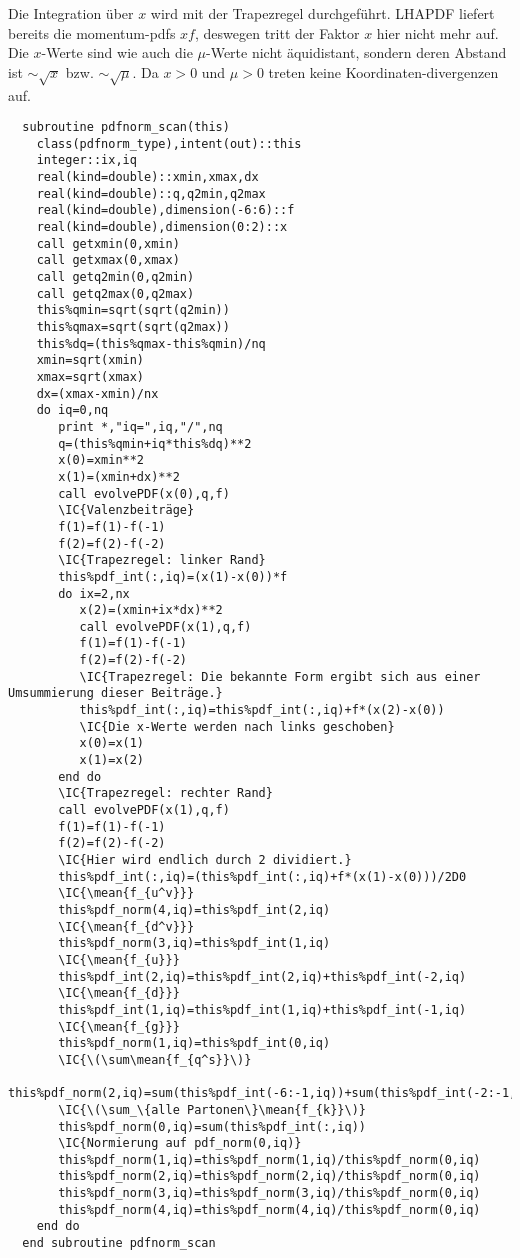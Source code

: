 Die Integration über $x$ wird mit der Trapezregel durchgeführt. LHAPDF liefert bereits die momentum-pdfs $xf$, deswegen tritt der Faktor $x$ hier nicht mehr auf. Die $x$-Werte sind wie auch die $\mu$-Werte nicht äquidistant, sondern deren Abstand ist $\sim\sqrt{x}$ bzw. $\sim\sqrt{\mu}$. Da $x>0$ und $\mu>0$ treten keine Koordinaten-divergenzen auf. 
\begin{Verbatim}
  subroutine pdfnorm_scan(this)
    class(pdfnorm_type),intent(out)::this
    integer::ix,iq
    real(kind=double)::xmin,xmax,dx
    real(kind=double)::q,q2min,q2max
    real(kind=double),dimension(-6:6)::f
    real(kind=double),dimension(0:2)::x
    call getxmin(0,xmin)
    call getxmax(0,xmax)
    call getq2min(0,q2min)
    call getq2max(0,q2max)
    this%qmin=sqrt(sqrt(q2min))
    this%qmax=sqrt(sqrt(q2max))
    this%dq=(this%qmax-this%qmin)/nq
    xmin=sqrt(xmin)
    xmax=sqrt(xmax)
    dx=(xmax-xmin)/nx
    do iq=0,nq
       print *,"iq=",iq,"/",nq
       q=(this%qmin+iq*this%dq)**2
       x(0)=xmin**2
       x(1)=(xmin+dx)**2
       call evolvePDF(x(0),q,f)
       \IC{Valenzbeiträge}
       f(1)=f(1)-f(-1)
       f(2)=f(2)-f(-2)
       \IC{Trapezregel: linker Rand}
       this%pdf_int(:,iq)=(x(1)-x(0))*f
       do ix=2,nx
          x(2)=(xmin+ix*dx)**2
          call evolvePDF(x(1),q,f)
          f(1)=f(1)-f(-1)
          f(2)=f(2)-f(-2)
          \IC{Trapezregel: Die bekannte Form ergibt sich aus einer Umsummierung dieser Beiträge.}
          this%pdf_int(:,iq)=this%pdf_int(:,iq)+f*(x(2)-x(0))
          \IC{Die x-Werte werden nach links geschoben}
          x(0)=x(1)
          x(1)=x(2)
       end do
       \IC{Trapezregel: rechter Rand}
       call evolvePDF(x(1),q,f)
       f(1)=f(1)-f(-1)
       f(2)=f(2)-f(-2)
       \IC{Hier wird endlich durch 2 dividiert.}
       this%pdf_int(:,iq)=(this%pdf_int(:,iq)+f*(x(1)-x(0)))/2D0
       \IC{\mean{f_{u^v}}}
       this%pdf_norm(4,iq)=this%pdf_int(2,iq)
       \IC{\mean{f_{d^v}}}
       this%pdf_norm(3,iq)=this%pdf_int(1,iq)
       \IC{\mean{f_{u}}}
       this%pdf_int(2,iq)=this%pdf_int(2,iq)+this%pdf_int(-2,iq)
       \IC{\mean{f_{d}}}
       this%pdf_int(1,iq)=this%pdf_int(1,iq)+this%pdf_int(-1,iq)
       \IC{\mean{f_{g}}}
       this%pdf_norm(1,iq)=this%pdf_int(0,iq)
       \IC{\(\sum\mean{f_{q^s}}\)}
       this%pdf_norm(2,iq)=sum(this%pdf_int(-6:-1,iq))+sum(this%pdf_int(-2:-1,iq))+sum(this%pdf_int(3:6,iq))
       \IC{\(\sum_\{alle Partonen\}\mean{f_{k}}\)}
       this%pdf_norm(0,iq)=sum(this%pdf_int(:,iq))
       \IC{Normierung auf pdf_norm(0,iq)}
       this%pdf_norm(1,iq)=this%pdf_norm(1,iq)/this%pdf_norm(0,iq)
       this%pdf_norm(2,iq)=this%pdf_norm(2,iq)/this%pdf_norm(0,iq)
       this%pdf_norm(3,iq)=this%pdf_norm(3,iq)/this%pdf_norm(0,iq)
       this%pdf_norm(4,iq)=this%pdf_norm(4,iq)/this%pdf_norm(0,iq)
    end do
  end subroutine pdfnorm_scan
\end{Verbatim}

